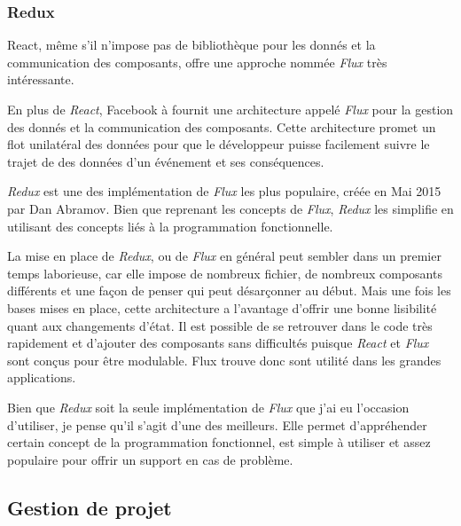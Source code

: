 \documentclass[12pt,a4paper]{article}
\begin{document}
  \bigskip

  \subsubsection{Redux}\label{redux}

  \bigskip

  React, même s'il n'impose pas de bibliothèque pour les donnés et la
  communication des composants, offre une approche nommée \emph{Flux} très
  intéressante.

  \bigskip

  En plus de \emph{React}, Facebook à fournit une architecture appelé
  \emph{Flux} pour la gestion des donnés et la communication des
  composants. Cette architecture promet un flot unilatéral des données
  pour que le développeur puisse facilement suivre le trajet de des
  données d'un événement et ses conséquences.

  \bigskip

  \emph{Redux} est une des implémentation de \emph{Flux} les plus
  populaire, créée en Mai 2015 par Dan Abramov. Bien que reprenant les
  concepts de \emph{Flux}, \emph{Redux} les simplifie en utilisant des
  concepts liés à la programmation fonctionnelle.

  \bigskip

  La mise en place de \emph{Redux}, ou de \emph{Flux} en général peut
  sembler dans un premier temps laborieuse, car elle impose de nombreux
  fichier, de nombreux composants différents et une façon de penser qui
  peut désarçonner au début. Mais une fois les bases mises en place, cette
  architecture a l'avantage d'offrir une bonne lisibilité quant aux
  changements d'état. Il est possible de se retrouver dans le code très
  rapidement et d'ajouter des composants sans difficultés puisque
  \emph{React} et \emph{Flux} sont conçus pour être modulable. Flux trouve
  donc sont utilité dans les grandes applications.

  \bigskip

  Bien que \emph{Redux} soit la seule implémentation de \emph{Flux} que
  j'ai eu l'occasion d'utiliser, je pense qu'il s'agit d'une des
  meilleurs. Elle permet d'appréhender certain concept de la programmation
  fonctionnel, est simple à utiliser et assez populaire pour offrir un
  support en cas de problème.

  \bigskip

  \subsection{Gestion de projet}\label{gestion-de-projet}
\end{document}
